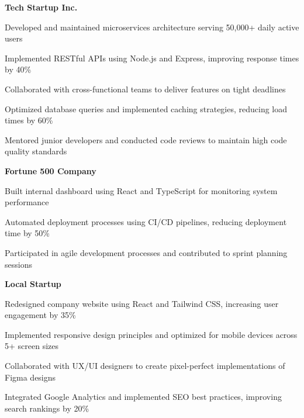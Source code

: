 \noindent\textbf{Tech Startup Inc.} \\
 
\begin{tightitemize}
  \item Developed and maintained microservices architecture serving 50,000+ daily active users
  \item Implemented RESTful APIs using Node.js and Express, improving response times by 40\%
  \item Collaborated with cross-functional teams to deliver features on tight deadlines
  \item Optimized database queries and implemented caching strategies, reducing load times by 60\%
  \item Mentored junior developers and conducted code reviews to maintain high code quality standards
\end{tightitemize}

\vspace{0.3em}
\noindent\textbf{Fortune 500 Company} \\
 
\begin{tightitemize}
  \item Built internal dashboard using React and TypeScript for monitoring system performance
  \item Automated deployment processes using CI/CD pipelines, reducing deployment time by 50\%
  \item Participated in agile development processes and contributed to sprint planning sessions
\end{tightitemize}

\vspace{0.3em}
\noindent\textbf{Local Startup} \\
 
\begin{tightitemize}
  \item Redesigned company website using React and Tailwind CSS, increasing user engagement by 35\%
  \item Implemented responsive design principles and optimized for mobile devices across 5+ screen sizes
  \item Collaborated with UX/UI designers to create pixel-perfect implementations of Figma designs
  \item Integrated Google Analytics and implemented SEO best practices, improving search rankings by 20\%
\end{tightitemize}
